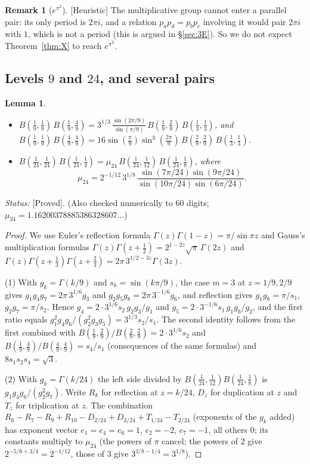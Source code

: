 \documentclass[11pt]{amsart}
\newtheorem{lemma}[theorem]{Lemma}
\theoremstyle{definition}
\newtheorem{remark}[theorem]{Remark}
\newcommand{\lab}[1]{\textup{[#1]}}
\newcommand{\Status}{\noindent\emph{Status:} }
\begin{document}
\begin{remark}[$e^{\pi^2}$]
\lab{Heuristic} The multiplicative group cannot enter a parallel pair: its only period is $2\pi i$, and a relation
$p_ap_d=p_bp_c$ involving it would pair $2\pi i$ with $1$, which is not a period (this is argued in \S\ref{sec:3E}). So we
do not expect Theorem~\ref{thm:X} to reach $e^{\pi^2}$.
\end{remark}

\subsection{Levels $9$ and $24$, and several pairs}\label{sec:X924}

\begin{lemma}\label{lem:rel924}
\begin{itemize}
\item[(1)] $B(\tfrac19,\tfrac19)\,B(\tfrac19,\tfrac49)=3^{1/3}\,\frac{\sin(2\pi/9)}{\sin(\pi/9)}\,B(\tfrac19,\tfrac29)\,B(\tfrac13,\tfrac13)$,
and $B(\tfrac19,\tfrac19)\,B(\tfrac49,\tfrac49)=16\sin(\tfrac\pi9)\sin^3(\tfrac{2\pi}9)\,B(\tfrac29,\tfrac29)\,B(\tfrac13,\tfrac13)$.
\item[(2)] $B(\tfrac1{24},\tfrac1{24})\,B(\tfrac1{24},\tfrac14)=\mu_{24}\,B(\tfrac1{24},\tfrac1{12})\,B(\tfrac1{24},\tfrac18)$, where
\[\mu_{24}=2^{-1/12}\,3^{1/8}\,\frac{\sin(7\pi/24)\sin(9\pi/24)}{\sin(10\pi/24)\sin(6\pi/24)}.\]
\end{itemize}
\end{lemma}

\Status \lab{Proved}. (Also checked numerically to $60$ digits; $\mu_{24}=1.16200378885386328607\ldots$)

\begin{proof}
We use Euler's reflection formula $\Gamma(z)\Gamma(1-z)=\pi/\sin\pi z$ and Gauss's multiplication formulas
$\Gamma(z)\Gamma(z+\frac12)=2^{1-2z}\sqrt\pi\,\Gamma(2z)$ and $\Gamma(z)\Gamma(z+\frac13)\Gamma(z+\frac23)=2\pi\,3^{1/2-3z}\Gamma(3z)$.

(1) With $g_k=\Gamma(k/9)$ and $s_k=\sin(k\pi/9)$, the case $m=3$ at $z=1/9,2/9$ gives $g_1g_4g_7=2\pi\,3^{1/6}g_3$ and
$g_2g_5g_8=2\pi\,3^{-1/6}g_6$, and reflection gives $g_1g_8=\pi/s_1$, $g_2g_7=\pi/s_2$. Hence
$g_4=2\cdot3^{1/6}s_2\,g_2g_3/g_1$ and $g_5=2\cdot3^{-1/6}s_1\,g_1g_6/g_2$, and the first ratio equals
$g_1^2g_4g_6/(g_2^2g_3g_5)=3^{1/3}s_2/s_1$. The second identity follows from the first combined with
$B(\frac19,\frac29)/B(\frac29,\frac29)=2\cdot3^{1/6}s_2$ and $B(\frac19,\frac49)/B(\frac49,\frac49)=s_4/s_1$ (consequences
of the same formulas) and $8s_1s_2s_4=\sqrt3$.

(2) With $g_k=\Gamma(k/24)$ the left side divided by $B(\frac1{24},\frac1{12})B(\frac1{24},\frac18)$ is
$g_1g_4g_6/(g_2^2g_7)$. Write $R_k$ for reflection at $z=k/24$, $D_z$ for duplication at $z$ and $T_z$ for triplication at $z$.
The combination $R_6-R_7-R_9+R_{10}-D_{2/24}+D_{3/24}+T_{1/24}-T_{2/24}$ (exponents of the $g_k$ added) has exponent vector
$e_1=e_4=e_6=1$, $e_2=-2$, $e_7=-1$, all others $0$; its constants multiply to $\mu_{24}$ (the powers of $\pi$ cancel; the
powers of $2$ give $2^{-5/6+3/4}=2^{-1/12}$, those of $3$ give $3^{3/8-1/4}=3^{1/8}$).
\end{proof}
\end{document}
